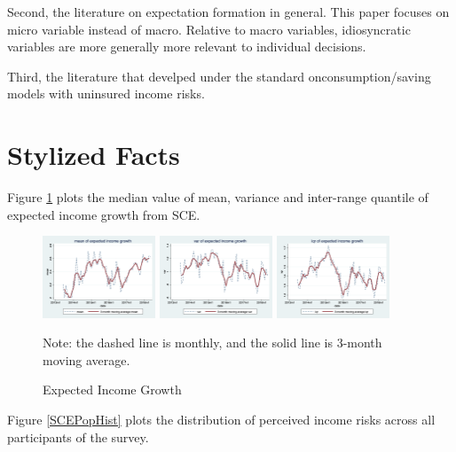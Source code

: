 \documentclass[]{article}
\begin{document}
Second, the literature on expectation formation in general. This paper focuses on micro variable instead of macro. Relative to macro variables, idiosyncratic variables are more generally more relevant to individual decisions. 

Third, the literature that develped under the standard onconsumption/saving models with uninsured income risks. 


\section{Stylized Facts}

Figure \ref{SCEPopTS} plots the median value of mean, variance and inter-range quantile of expected income growth from SCE.  

	\begin{figure}[ht]
	
		\centering
		\caption{Expected Income Growth }
		\label{SCEPopTS}
		\includegraphics[width=0.3\textwidth]{figures/median_mean.png}
		\includegraphics[width=0.3\textwidth]{figures/median_var.png}
		\includegraphics[width=0.3\textwidth]{figures/median_iqr.png}
	\begin{flushleft}
		{\footnotesize Note: the dashed line is monthly, and the solid line is 3-month moving average. }
	\end{flushleft}

\end{figure}


Figure \ref{SCEPopHist} plots the distribution of perceived income risks across all participants of the survey. 
\end{document}
